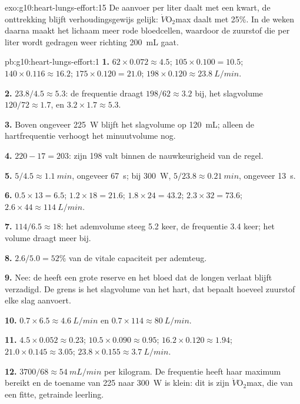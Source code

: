 \begin{solution}{exo:g10:heart-lungs-effort:15}
De aanvoer per liter daalt met een kwart, de onttrekking blijft
verhoudingsgewijs gelijk: $\dot V\!\mathrm{O_2}$max daalt met 25\%. In de
weken daarna maakt het lichaam meer rode bloedcellen, waardoor de
zuurstof die per liter wordt gedragen weer richting \qty{200}{mL} gaat.
\end{solution}

\begin{solution}{pb:g10:heart-lungs-effort:1}
\textbf{1.} $62 \times 0.072 \approx 4.5$; $105 \times 0.100 = 10.5$;
$140 \times 0.116 \approx 16.2$; $175 \times 0.120 = 21.0$;
$198 \times 0.120 \approx \qty{23.8}{L/min}$.

\textbf{2.} $23.8/4.5 \approx 5.3$: de frequentie draagt $198/62
\approx 3.2$ bij, het slagvolume $120/72 \approx 1.7$, en $3.2 \times
1.7 \approx 5.3$.

\textbf{3.} Boven ongeveer \qty{225}{W} blijft het slagvolume op
\qty{120}{mL}; alleen de hartfrequentie verhoogt het minuutvolume nog.

\textbf{4.} $220 - 17 = 203$: zijn 198 valt binnen de nauwkeurigheid van de regel.

\textbf{5.} $5/4.5 \approx \qty{1.1}{min}$, ongeveer \qty{67}{s}; bij
\qty{300}{W}, $5/23.8 \approx \qty{0.21}{min}$, ongeveer \qty{13}{s}.

\textbf{6.} $0.5 \times 13 = 6.5$; $1.2 \times 18 = 21.6$; $1.8 \times
24 = 43.2$; $2.3 \times 32 = 73.6$; $2.6 \times 44 \approx
\qty{114}{L/min}$.

\textbf{7.} $114/6.5 \approx 18$: het ademvolume steeg 5.2 keer, de
frequentie 3.4 keer; het volume draagt meer bij.

\textbf{8.} $2.6/5.0 = 52\%$ van de vitale capaciteit per ademteug.

\textbf{9.} Nee: de  heeft een grote reserve en het bloed dat
de longen verlaat blijft verzadigd. De grens is het slagvolume van het
hart, dat bepaalt hoeveel zuurstof elke slag aanvoert.

\textbf{10.} $0.7 \times 6.5 \approx \qty{4.6}{L/min}$ en $0.7 \times
114 \approx \qty{80}{L/min}$.

\textbf{11.} $4.5 \times 0.052 \approx 0.23$; $10.5 \times 0.090
\approx 0.95$; $16.2 \times 0.120 \approx 1.94$; $21.0 \times 0.145
\approx 3.05$; $23.8 \times 0.155 \approx \qty{3.7}{L/min}$.

\textbf{12.} $3700/68 \approx \qty{54}{mL/min}$ per kilogram. De
frequentie heeft haar maximum bereikt en de toename van 225 naar
\qty{300}{W} is klein: dit is zijn $\dot V\!\mathrm{O_2}$max, die van een
fitte, getrainde leerling.


\end{solution}
